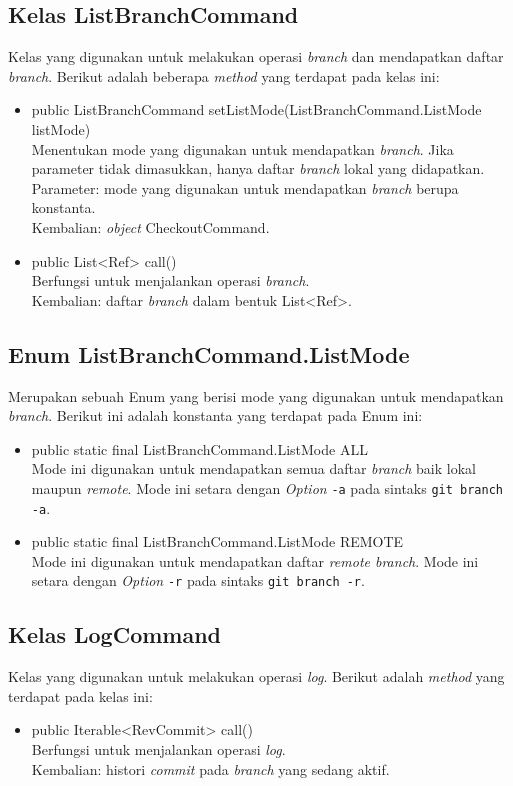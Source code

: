 \subsection{Kelas ListBranchCommand}
\label{subsec:listbranchcommand}
Kelas yang digunakan untuk melakukan operasi \textit{branch} dan mendapatkan daftar \textit{branch}.
Berikut adalah beberapa \textit{method} yang terdapat pada kelas ini:
\begin{itemize}
\item public ListBranchCommand setListMode(ListBranchCommand.ListMode listMode)\\
Menentukan mode yang digunakan untuk mendapatkan \textit{branch}. Jika parameter tidak dimasukkan, hanya daftar \textit{branch} lokal yang didapatkan.\\
Parameter: mode yang digunakan untuk mendapatkan \textit{branch} berupa konstanta.\\
Kembalian: \textit{object} CheckoutCommand.
\item public List<Ref> call()\\
Berfungsi untuk menjalankan operasi \textit{branch}.\\
Kembalian: daftar \textit{branch} dalam bentuk List<Ref>.
\end{itemize}

\subsection{Enum ListBranchCommand.ListMode}
Merupakan sebuah Enum yang berisi mode yang digunakan untuk mendapatkan \textit{branch}.
Berikut ini adalah konstanta yang terdapat pada Enum ini:
\begin{itemize}
\item public static final ListBranchCommand.ListMode ALL\\
Mode ini digunakan untuk mendapatkan semua daftar \textit{branch} baik lokal maupun \textit{remote}. Mode ini setara dengan \textit{Option} \texttt{-a} pada sintaks \texttt{git branch -a}.
\item public static final ListBranchCommand.ListMode REMOTE\\
Mode ini digunakan untuk mendapatkan daftar \textit{remote branch}. Mode ini setara dengan \textit{Option} \texttt{-r} pada sintaks \texttt{git branch -r}. 
\end{itemize}


\subsection{Kelas LogCommand}
\label{subsec:logcommand}
Kelas yang digunakan untuk melakukan operasi \textit{log}.
Berikut adalah \textit{method} yang terdapat pada kelas ini:
\begin{itemize}
\item public Iterable<RevCommit> call()\\
Berfungsi untuk menjalankan operasi \textit{log}.\\
Kembalian: histori \textit{commit} pada \textit{branch} yang sedang aktif. 
\end{itemize}

